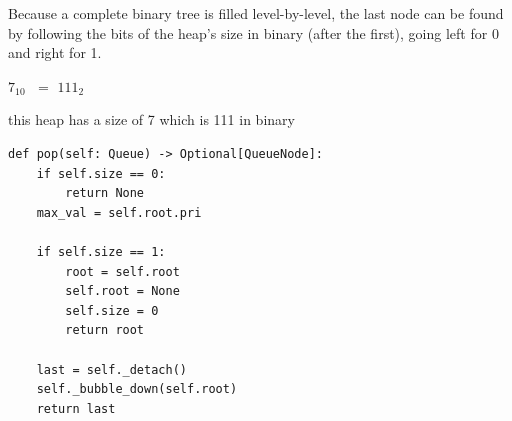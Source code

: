 \documentclass[mathserif, handout]{beamer}
\begin{document}
\begin{frame}
Because a complete binary tree is filled level-by-level, the last node can be found by following the bits of the heap’s size in binary (after the first), going left for 0 and right for 1.
\begin{center}
\Large $7$\color{lightgray}$_{10}$\color{black} $\;=$ \color{gray}$1$\color{myyellow}$11$\color{lightgray}$_2$
\end{center}

\begin{center}

\end{center}
\begin{center}
\footnotesize\color{gray} this heap has a size of 7 which is 111 in binary
\end{center}
\end{frame}

\begin{frame}[fragile]
\begin{thmbox}
\begin{lstlisting}[style=mypython]
def pop(self: Queue) -> Optional[QueueNode]:
    if self.size == 0:
        return None
    max_val = self.root.pri
    
    if self.size == 1:
        root = self.root
        self.root = None
        self.size = 0
        return root
        
    last = self._detach()
    self._bubble_down(self.root)
    return last
\end{lstlisting}
\end{thmbox}
\end{frame}
\end{document}
